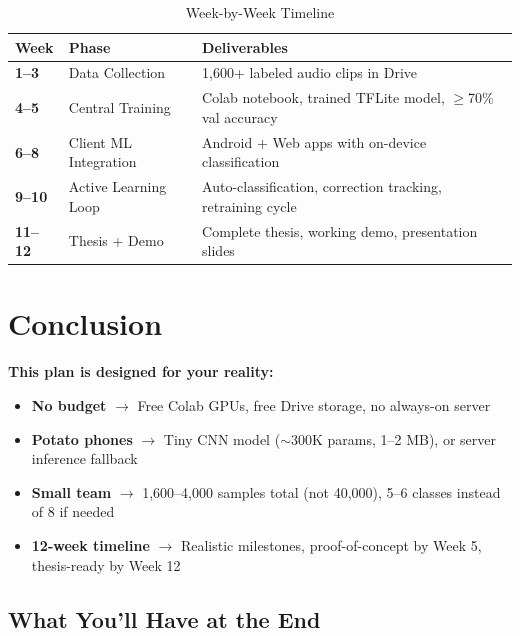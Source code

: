 \documentclass[11pt,a4paper]{article}
\begin{document}
\begin{table}[h]
\centering
\caption{Week-by-Week Timeline}
\begin{tabular}{@{}p{2.5cm}p{3.5cm}p{7cm}@{}}
\toprule
\textbf{Week} & \textbf{Phase} & \textbf{Deliverables} \\
\midrule
\textbf{1--3} & Data Collection & 1,600+ labeled audio clips in Drive \\
\textbf{4--5} & Central Training & Colab notebook, trained TFLite model, $\geq$70\% val accuracy \\
\textbf{6--8} & Client ML Integration & Android + Web apps with on-device classification \\
\textbf{9--10} & Active Learning Loop & Auto-classification, correction tracking, retraining cycle \\
\textbf{11--12} & Thesis + Demo & Complete thesis, working demo, presentation slides \\
\bottomrule
\end{tabular}
\end{table}

\section{Conclusion}

\begin{highlightbox}
\textbf{This plan is designed for your reality:}
\begin{itemize}
    \item \textbf{No budget} $\rightarrow$ Free Colab GPUs, free Drive storage, no always-on server
    \item \textbf{Potato phones} $\rightarrow$ Tiny CNN model ($\sim$300K params, 1--2 MB), or server inference fallback
    \item \textbf{Small team} $\rightarrow$ 1,600--4,000 samples total (not 40,000), 5--6 classes instead of 8 if needed
    \item \textbf{12-week timeline} $\rightarrow$ Realistic milestones, proof-of-concept by Week 5, thesis-ready by Week 12
\end{itemize}
\end{highlightbox}

\subsection{What You'll Have at the End}
\end{document}

